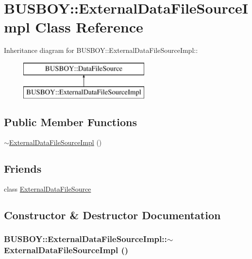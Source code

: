 \hypertarget{classBUSBOY_1_1ExternalDataFileSourceImpl}{
\section{BUSBOY::ExternalDataFileSourceImpl Class Reference}
\label{classBUSBOY_1_1ExternalDataFileSourceImpl}
}
Inheritance diagram for BUSBOY::ExternalDataFileSourceImpl::\begin{figure}[H]
\begin{center}
\leavevmode
\includegraphics[height=2cm]{classBUSBOY_1_1ExternalDataFileSourceImpl}
\end{center}
\end{figure}
\subsection*{Public Member Functions}
\begin{DoxyCompactItemize}
\item 
\hyperlink{classBUSBOY_1_1ExternalDataFileSourceImpl_a2587290f0079ed2e5fbdb3c2bdb96394}{$\sim$ExternalDataFileSourceImpl} ()
\end{DoxyCompactItemize}
\subsection*{Friends}
\begin{DoxyCompactItemize}
\item 
class \hyperlink{classBUSBOY_1_1ExternalDataFileSourceImpl_a987546c386fad7e10e7a33b1650e4a9a}{ExternalDataFileSource}
\end{DoxyCompactItemize}


\subsection{Constructor \& Destructor Documentation}
\hypertarget{classBUSBOY_1_1ExternalDataFileSourceImpl_a2587290f0079ed2e5fbdb3c2bdb96394}{
\subsubsection[{$\sim$ExternalDataFileSourceImpl}]{\setlength{\rightskip}{0pt plus 5cm}BUSBOY::ExternalDataFileSourceImpl::$\sim$ExternalDataFileSourceImpl ()}}
\label{classBUSBOY_1_1ExternalDataFileSourceImpl_a2587290f0079ed2e5fbdb3c2bdb96394}


